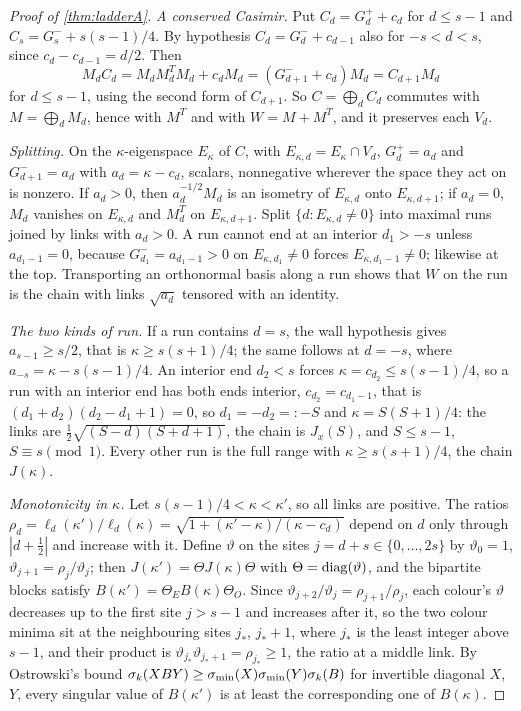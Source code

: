 \begin{proof}[Proof of \cref{thm:ladderA}]
\emph{A conserved Casimir.} Put $C_d=G^+_d+c_d$ for $d\le s-1$ and $C_s=G^-_s+s(s-1)/4$. By
hypothesis $C_d=G^-_d+c_{d-1}$ also for $-s<d<s$, since $c_d-c_{d-1}=d/2$. Then
\[
  M_dC_d=M_dM_d^TM_d+c_dM_d=(G^-_{d+1}+c_d)M_d=C_{d+1}M_d
\]
for $d\le s-1$, using the second form of $C_{d+1}$. So $C=\bigoplus_dC_d$ commutes with
$M=\bigoplus_dM_d$, hence with $M^T$ and with $W=M+M^T$, and it preserves each $V_d$.

\emph{Splitting.} On the $\kappa$-eigenspace $E_\kappa$ of $C$, with $E_{\kappa,d}=E_\kappa\cap V_d$,
$G^+_d=a_d$ and $G^-_{d+1}=a_d$ with $a_d=\kappa-c_d$, scalars, nonnegative wherever the space
they act on is nonzero. If $a_d>0$, then $a_d^{-1/2}M_d$ is an isometry of $E_{\kappa,d}$ onto
$E_{\kappa,d+1}$; if $a_d=0$, $M_d$ vanishes on $E_{\kappa,d}$ and $M_d^T$ on $E_{\kappa,d+1}$. Split
$\{d:E_{\kappa,d}\ne0\}$ into maximal runs joined by links with $a_d>0$. A run cannot end at
an interior $d_1>-s$ unless $a_{d_1-1}=0$, because $G^-_{d_1}=a_{d_1-1}>0$ on $E_{\kappa,d_1}\ne0$
forces $E_{\kappa,d_1-1}\ne0$; likewise at the top. Transporting an orthonormal basis along
a run shows that $W$ on the run is the chain with links $\sqrt{a_d}$ tensored with an
identity.

\emph{The two kinds of run.} If a run contains $d=s$, the wall hypothesis gives
$a_{s-1}\ge s/2$, that is $\kappa\ge s(s+1)/4$; the same follows at $d=-s$, where
$a_{-s}=\kappa-s(s-1)/4$. An interior end $d_2<s$ forces $\kappa=c_{d_2}\le s(s-1)/4$, so a run
with an interior end has both ends interior, $c_{d_2}=c_{d_1-1}$, that is
$(d_1+d_2)(d_2-d_1+1)=0$, so $d_1=-d_2=:-S$ and $\kappa=S(S+1)/4$: the links are
$\frac12\sqrt{(S-d)(S+d+1)}$, the chain is $J_x(S)$, and $S\le s-1$, $S\equiv s\pmod1$. Every
other run is the full range with $\kappa\ge s(s+1)/4$, the chain $J(\kappa)$.

\emph{Monotonicity in $\kappa$.} Let $s(s-1)/4<\kappa<\kappa'$, so all links are positive. The
ratios $\rho_d=\ell_d(\kappa')/\ell_d(\kappa)=\sqrt{1+(\kappa'-\kappa)/(\kappa-c_d)}$ depend on $d$
only through $|d+\frac12|$ and increase with it. Define $\vartheta$ on the sites
$j=d+s\in\{0,\dots,2s\}$ by $\vartheta_0=1$, $\vartheta_{j+1}=\rho_j/\vartheta_j$; then
$J(\kappa')=\Theta J(\kappa)\Theta$ with $\Theta=\operatorname{diag}(\vartheta)$, and the bipartite blocks satisfy
$B(\kappa')=\Theta_EB(\kappa)\Theta_O$. Since $\vartheta_{j+2}/\vartheta_j=\rho_{j+1}/\rho_j$, each
colour's $\vartheta$ decreases up to the first site $j>s-1$ and increases after it, so the two
colour minima sit at the neighbouring sites $j_*$, $j_*+1$, where $j_*$ is the least integer
above $s-1$, and their product is $\vartheta_{j_*}\vartheta_{j_*+1}=\rho_{j_*}\ge1$, the ratio at a middle
link. By Ostrowski's bound $\sigma_k(XBY)\ge\sigma_{\min}(X)\sigma_{\min}(Y)\sigma_k(B)$ for invertible diagonal
$X$, $Y$, every singular value of $B(\kappa')$ is at least the corresponding one of $B(\kappa)$.


\end{proof}

